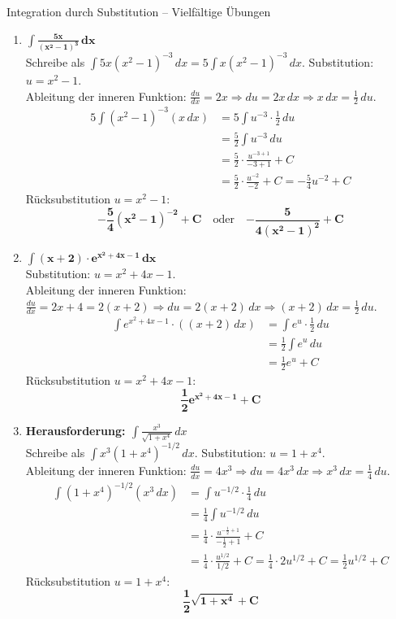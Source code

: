 \begin{loesungsumgebung}{Integration durch Substitution – Vielfältige Übungen}
\begin{enumerate}[label=(\alph*)]
    \item $\mathbf{\int \frac{5x}{(x^2-1)^3} \,dx}$ \\
    Schreibe als $\int 5x(x^2-1)^{-3} \,dx = 5 \int x(x^2-1)^{-3} \,dx$.
    Substitution: $u = x^2-1$. \\
    Ableitung der inneren Funktion: $\frac{du}{dx} = 2x \Rightarrow du = 2x \,dx \Rightarrow x \,dx = \frac{1}{2} \,du$.
    \begin{align*} 5 \int (x^2-1)^{-3} (x \,dx) &= 5 \int u^{-3} \cdot \frac{1}{2} \,du \\ &= \frac{5}{2} \int u^{-3} \,du \\ &= \frac{5}{2} \cdot \frac{u^{-3+1}}{-3+1} + C \\ &= \frac{5}{2} \cdot \frac{u^{-2}}{-2} + C = -\frac{5}{4}u^{-2} + C \end{align*}
    Rücksubstitution $u=x^2-1$:
    $$ \mathbf{-\frac{5}{4}(x^2-1)^{-2} + C} \quad \text{oder} \quad \mathbf{-\frac{5}{4(x^2-1)^2} + C} $$

    \item $\mathbf{\int (x+2) \cdot e^{x^2+4x-1} \,dx}$ \\
    Substitution: $u = x^2+4x-1$. \\
    Ableitung der inneren Funktion: $\frac{du}{dx} = 2x+4 = 2(x+2) \Rightarrow du = 2(x+2) \,dx \Rightarrow (x+2) \,dx = \frac{1}{2} \,du$.
    \begin{align*} \int e^{x^2+4x-1} \cdot ((x+2) \,dx) &= \int e^u \cdot \frac{1}{2} \,du \\ &= \frac{1}{2} \int e^u \,du \\ &= \frac{1}{2}e^u + C \end{align*}
    Rücksubstitution $u=x^2+4x-1$:
    $$ \mathbf{\frac{1}{2}e^{x^2+4x-1} + C} $$

    \item \textbf{Herausforderung: $\int \frac{x^3}{\sqrt{1+x^4}} \,dx$} \\
    Schreibe als $\int x^3 (1+x^4)^{-1/2} \,dx$.
    Substitution: $u = 1+x^4$. \\
    Ableitung der inneren Funktion: $\frac{du}{dx} = 4x^3 \Rightarrow du = 4x^3 \,dx \Rightarrow x^3 \,dx = \frac{1}{4} \,du$.
    \begin{align*} \int (1+x^4)^{-1/2} (x^3 \,dx) &= \int u^{-1/2} \cdot \frac{1}{4} \,du \\ &= \frac{1}{4} \int u^{-1/2} \,du \\ &= \frac{1}{4} \cdot \frac{u^{-\frac{1}{2}+1}}{-\frac{1}{2}+1} + C \\ &= \frac{1}{4} \cdot \frac{u^{1/2}}{1/2} + C = \frac{1}{4} \cdot 2u^{1/2} + C = \frac{1}{2}u^{1/2} + C \end{align*}
    Rücksubstitution $u=1+x^4$:
    $$ \mathbf{\frac{1}{2}\sqrt{1+x^4} + C} $$
\end{enumerate}

\end{loesungsumgebung}

